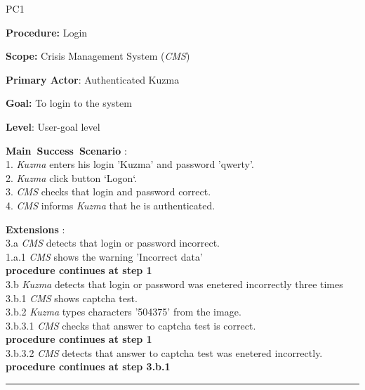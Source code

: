 \begin{lyxlist}{PC1}
\small{
\item [\textbf{Procedure:}] Login
\item [\textbf{Scope:}] Crisis Management System (\emph{CMS})
\item [\textbf{Primary Actor}:] Authenticated Kuzma
\item [\textbf{Goal:}] To login to the system
\item [\textbf{Level}:] User-goal level
\item [\textbf{Main~Success~Scenario}]:\\
1. \emph{Kuzma} enters his login 'Kuzma' and password 'qwerty'. \\
2. \emph{Kuzma} click button `Logon`.\\
3. \emph{CMS} checks that login and password correct.\\
4. \emph{CMS} informs \emph{Kuzma} that he is authenticated.\\
\item [\textbf{Extensions}]:\\
3.a \emph{CMS} detects that login or password incorrect.\\
\hspace*{0.5cm} 1.a.1 \emph{CMS} shows the warning 'Incorrect data'\\ 
\hspace*{0.5cm} \textbf{procedure continues at step 1}\\
3.b \emph{Kuzma} detects that login or password was enetered incorrectly three
times\\
\hspace*{0.5cm} 3.b.1 \emph{CMS} shows captcha test.\\ 
\hspace*{0.5cm} 3.b.2 \emph{Kuzma} types characters '504375' from the image.\\ 
\hspace*{0.5cm} 3.b.3.1 \emph{CMS} checks that answer to captcha test is
correct.\\
\hspace*{0.5cm} \textbf{procedure continues at step 1} \\
\hspace*{0.5cm} 3.b.3.2 \emph{CMS} detects that answer to captcha test was
enetered incorrectly.\\
\hspace*{0.5cm} \textbf{procedure continues at step 3.b.1}
}
\end{lyxlist}
\hrule
\vspace{0.5cm}

